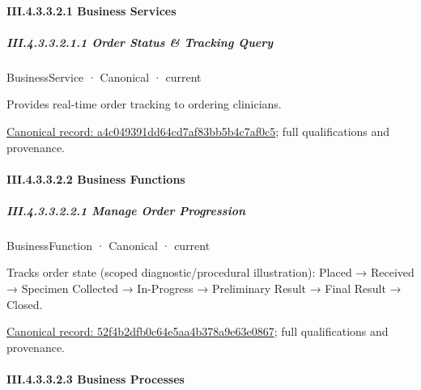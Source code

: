 \paragraph*{III.4.3.3.2.1 Business Services}
\label{navigation:III.4.3.3.2.1}

\subparagraph*{III.4.3.3.2.1.1 Order Status \& Tracking Query}
\label{navigation:III.4.3.3.2.1.1}

\label{element:a4c049391dd64cd7af83bb5b4c7af0c5}
{\small BusinessService · Canonical · current}\par

Provides real-time order tracking to ordering clinicians.


{\footnotesize \href{../../../../continuum/business/business-service/a4c049391dd64cd7af83bb5b4c7af0c5.md}{Canonical record: a4c049391dd64cd7af83bb5b4c7af0c5}; full qualifications and provenance.}\par
\paragraph*{III.4.3.3.2.2 Business Functions}
\label{navigation:III.4.3.3.2.2}

\subparagraph*{III.4.3.3.2.2.1 Manage Order Progression}
\label{navigation:III.4.3.3.2.2.1}

\label{element:52f4b2dfb0c64e5aa4b378a9e63e0867}
{\small BusinessFunction · Canonical · current}\par

Tracks order state (scoped diagnostic/procedural illustration): Placed → Received → Specimen Collected → In-Progress → Preliminary Result → Final Result → Closed.


{\footnotesize \href{../../../../continuum/business/business-function/52f4b2dfb0c64e5aa4b378a9e63e0867.md}{Canonical record: 52f4b2dfb0c64e5aa4b378a9e63e0867}; full qualifications and provenance.}\par
\paragraph*{III.4.3.3.2.3 Business Processes}
\label{navigation:III.4.3.3.2.3}

